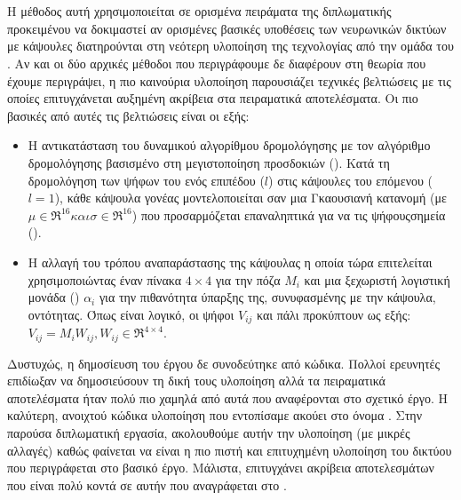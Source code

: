 \section{}

Η μέθοδος αυτή χρησιμοποιείται σε ορισμένα πειράματα της διπλωματικής προκειμένου να δοκιμαστεί αν ορισμένες βασικές υποθέσεις των νευρωνικών δικτύων με κάψουλες διατηρούνται στη νεότερη υλοποίηση της τεχνολογίας από την ομάδα του . Αν και οι δύο αρχικές μέθοδοι που περιγράφουμε δε διαφέρουν στη θεωρία που έχουμε περιγράψει, η πιο καινούρια υλοποίηση παρουσιάζει τεχνικές βελτιώσεις με τις οποίες επιτυγχάνεται αυξημένη ακρίβεια στα πειραματικά αποτελέσματα. Οι πιο βασικές από αυτές τις βελτιώσεις είναι οι εξής:
\begin{itemize}
  \item Η αντικατάσταση του δυναμικού αλγορίθμου δρομολόγησης με τον αλγόριθμο δρομολόγησης βασισμένο στη μεγιστοποίηση προσδοκιών (). Κατά τη δρομολόγηση των ψήφων του ενός επιπέδου ($l$) στις κάψουλες του επόμενου ($l=1$), κάθε κάψουλα γονέας μοντελοποιείται σαν μια Γκαουσιανή κατανομή (με $\mu \in \Re^{16} και \sigma \in \Re^{16}$) που προσαρμόζεται επαναληπτικά για να  τις ψήφους\textendash σημεία ().
  \item Η αλλαγή του τρόπου αναπαράστασης της κάψουλας η οποία τώρα επιτελείται χρησιμοποιώντας έναν πίνακα $4\times 4$ για την πόζα $M_i$ και μια ξεχωριστή λογιστική μονάδα () $\alpha_i$ για την πιθανότητα ύπαρξης της, συνυφασμένης με την κάψουλα, οντότητας. Όπως είναι λογικό, οι ψήφοι $V_{ij}$ και πάλι προκύπτουν ως εξής: $V_{ij} = M_iW_{ij}, W_{ij} \in \Re^{4\times 4}$.
\end{itemize}

Δυστυχώς, η δημοσίευση του έργου \cite{hinton2018matrix} δε συνοδεύτηκε από κώδικα. Πολλοί ερευνητές επιδίωξαν να δημοσιεύσουν τη δική τους υλοποίηση αλλά τα πειραματικά αποτελέσματα ήταν πολύ πιο χαμηλά από αυτά που αναφέρονται στο σχετικό έργο. Η καλύτερη, ανοιχτού κώδικα υλοποίηση που εντοπίσαμε ακούει στο όνομα  \cite{gritzman2019avoiding}. Στην παρούσα διπλωματική εργασία, ακολουθούμε αυτήν την υλοποίηση (με μικρές αλλαγές) καθώς φαίνεται να είναι η πιο πιστή και επιτυχημένη υλοποίηση του δικτύου που περιγράφεται στο βασικό έργο. Μάλιστα, επιτυγχάνει ακρίβεια αποτελεσμάτων που είναι πολύ κοντά σε αυτήν που αναγράφεται στο \cite{hinton2018matrix}.\par

